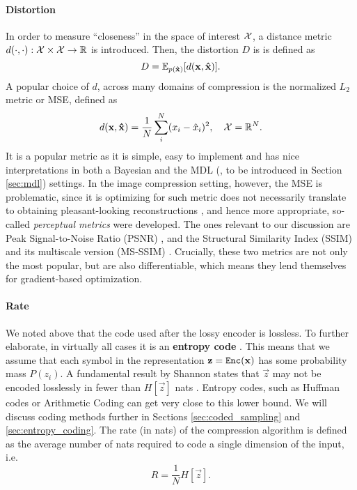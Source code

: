 \paragraph{Distortion}
In order to measure ``closeness'' in the space of interest $\mathcal{X}$,
a distance metric $d(\cdot, \cdot): \mathcal{X}
\times \mathcal{X} \rightarrow \mathbb{R}$ is introduced. Then, the distortion $D$ is 
is defined as
\[
  D = \mathbb{E}_{p(\mathbf{\hat{x}})}[d(\mathbf{x}, \mathbf{\hat{x}})].
\]
A popular choice of $d$, across many domains of compression is the normalized $L_2$ metric
or MSE, defined as
\[
  d(\mathbf{x}, \mathbf{\hat{x}}) = \frac{1}{N} \sum_{i}^N (x_i - \hat{x}_i)^2, \quad
  \mathcal{X} = \mathbb{R}^N.
\]
It is a popular metric as it is simple, easy to implement and has nice
interpretations in both a Bayesian \cite{bishop2013pattern} and the MDL
(\cite{hinton1993keeping}, to be introduced in Section \ref{sec:mdl}) settings.
In the image compression setting, however, the MSE is problematic, since it is
optimizing for such metric does not necessarily translate to obtaining pleasant-looking
reconstructions \cite{zhao2015loss}, and hence more appropriate, so-called \textit{perceptual
  metrics} were developed. The ones relevant to our discussion are Peak
Signal-to-Noise Ratio (PSNR) \cite{psnr}, \cite{gupta2011modified} and the
Structural Similarity Index (SSIM) \cite{wang2004image} and its multiscale
version (MS-SSIM) \cite{msssim}. Crucially, these
two metrics are not only the most popular, but are also differentiable, which
means they lend themselves for gradient-based optimization.

\paragraph{Rate}
We noted above that the code used after the lossy encoder is lossless. To
further elaborate, in virtually all cases it is an \textbf{entropy code}
\cite{goyal2001theoretical}. This means that we assume that each symbol
in the representation $\mathbf{z} = \mathtt{Enc}(\mathbf{x})$ has some probability mass
$P(z_i)$. A fundamental result by Shannon states that $\vec{z}$ may not be
encoded losslessly in fewer than $H[\vec{z}]$ nats
\cite{shannon1998mathematical}. Entropy codes, such as Huffman codes
\cite{huffman1952method} or Arithmetic Coding \cite{rissanen1981universal} can
get very close to this lower bound. We will discuss coding methods further in Sections
\ref{sec:coded_sampling} and \ref{sec:entropy_coding}. The rate (in nats) of the compression algorithm is defined
as the average number of nats required to code a single dimension of the input, i.e.
\[
  R = \frac{1}{N} H[\vec{z}].
\]
